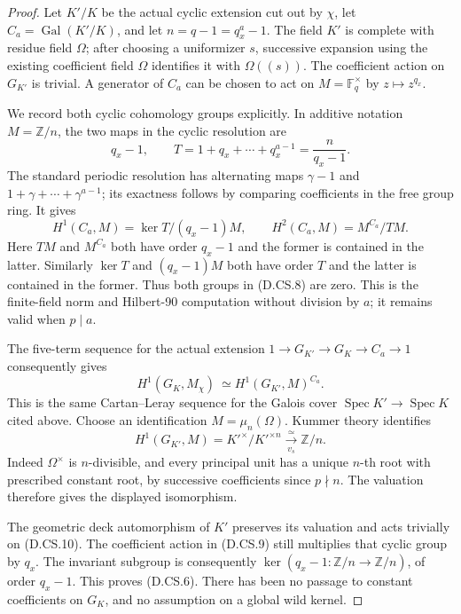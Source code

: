 \begin{proof}
Let \(K'/K\) be the actual cyclic extension cut out
by \(\chi\), let \(C_a=\operatorname{Gal}(K'/K)\),
and let \(n=q-1=q_x^a-1\).
The field \(K'\) is complete with residue field
\(\Omega\); after choosing a uniformizer \(s\),
successive expansion using the existing coefficient
field \(\Omega\) identifies it with \(\Omega((s))\).
The coefficient action on \(G_{K'}\) is trivial.
A generator of \(C_a\) can be chosen to act on
\(M=\mathbb F_q^\times\) by \(z\mapsto z^{q_x}\).

We record both cyclic cohomology groups explicitly.
In additive notation \(M=\mathbb Z/n\), the two
maps in the cyclic resolution are
\[
 q_x-1,\qquad
 T=1+q_x+\cdots+q_x^{a-1}
                         =\frac{n}{q_x-1}.            \tag{D.CS.7}
\]
The standard periodic resolution has alternating
maps \(\gamma-1\) and \(1+\gamma+\cdots+\gamma^{a-1}\);
its exactness follows by comparing coefficients in
the free group ring. It gives
\[
 H^1(C_a,M)=\ker T/(q_x-1)M,\qquad
 H^2(C_a,M)=M^{C_a}/TM.                               \tag{D.CS.8}
\]
Here \(TM\) and \(M^{C_a}\) both have order \(q_x-1\)
and the former is contained in the latter.
Similarly \(\ker T\) and \((q_x-1)M\) both have order
\(T\) and the latter is contained in the former.
Thus both groups in (D.CS.8) are zero. This is the
finite-field norm and Hilbert-90 computation without
division by \(a\); it remains valid when \(p\mid a\).

The five-term sequence for the actual extension
\(1\to G_{K'}\to G_K\to C_a\to1\) consequently gives
\[
 H^1(G_K,M_\chi)\ \simeq
                  H^1(G_{K'},M)^{C_a}.               \tag{D.CS.9}
\]
This is the same Cartan--Leray sequence for the
Galois cover \(\operatorname{Spec}K'\to
\operatorname{Spec}K\) cited above.
Choose an identification \(M=\mu_n(\Omega)\).
Kummer theory
\citep[Lemma 59.28.1 and its following long exact
sequence, Tag 03PK]{StacksControlledAnchorsD}
identifies
\[
 H^1(G_{K'},M)=K'^\times/K'^{\times n}
                   \xrightarrow[\ v_s\ ]{\ \simeq\ }
                              \mathbb Z/n.            \tag{D.CS.10}
\]
Indeed \(\Omega^\times\) is \(n\)-divisible, and
every principal unit has a unique \(n\)-th root
with prescribed constant root, by successive
coefficients since \(p\nmid n\). The valuation
therefore gives the displayed isomorphism.

The geometric deck automorphism of \(K'\) preserves
its valuation and acts trivially on (D.CS.10).
The coefficient action in (D.CS.9) still multiplies
that cyclic group by \(q_x\). The invariant subgroup
is consequently
\(\ker(q_x-1:\mathbb Z/n\to\mathbb Z/n)\),
of order \(q_x-1\). This proves (D.CS.6).
There has been no passage to constant coefficients
on \(G_K\), and no assumption on a global wild kernel.


\end{proof}
